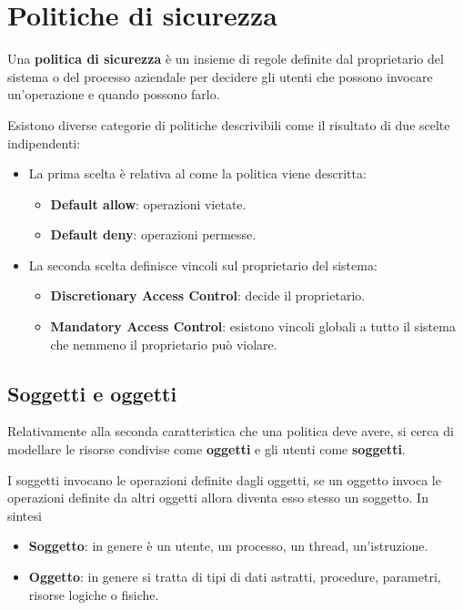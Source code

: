 \section{Politiche di sicurezza}
Una \textbf{politica di sicurezza} è un insieme di regole definite dal proprietario del sistema o del processo
aziendale per decidere gli utenti che possono invocare un'operazione e quando possono farlo.

Esistono diverse categorie di politiche descrivibili come il risultato di due scelte indipendenti:
\begin{itemize}
	\item La prima scelta è relativa al come la politica viene descritta:
	      \begin{itemize}
		      \item \textbf{Default allow}: operazioni vietate.
		      \item \textbf{Default deny}: operazioni permesse.
	      \end{itemize}
	\item La seconda scelta definisce vincoli sul proprietario del sistema:
	      \begin{itemize}
		      \item \textbf{Discretionary Access Control}: decide il proprietario.
		      \item \textbf{Mandatory Access Control}: esistono vincoli globali a tutto il sistema che nemmeno il
		            proprietario può violare.
	      \end{itemize}
\end{itemize}

\subsection{Soggetti e oggetti}
Relativamente alla seconda caratteristica che una politica deve avere, si cerca di modellare le risorse condivise
come \textbf{oggetti} e gli utenti come \textbf{soggetti}.

I soggetti invocano le operazioni definite dagli oggetti, se un oggetto invoca le operazioni definite da altri
oggetti allora diventa esso stesso un soggetto. In sintesi
\begin{itemize}
	\item \textbf{Soggetto}: in genere è un utente, un processo, un thread, un'istruzione.
	\item \textbf{Oggetto}: in genere si tratta di tipi di dati astratti, procedure, parametri, risorse logiche o
	      fisiche.
\end{itemize}

